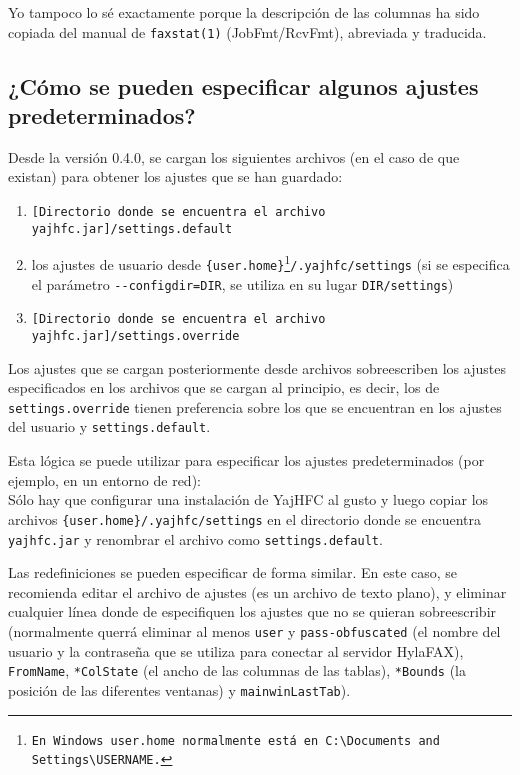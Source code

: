 \documentclass[a4paper,10pt]{scrartcl}
\begin{document}
Yo tampoco lo sé exactamente porque la descripción de las columnas ha sido copiada del manual de \verb#faxstat(1)# (JobFmt/RcvFmt), abreviada y traducida.

\subsection{¿Cómo se pueden especificar algunos ajustes predeterminados?}

Desde la versión 0.4.0, se cargan los siguientes archivos (en el caso de que existan) para obtener los ajustes que se han guardado:
\begin{enumerate}
 \item \texttt{[Directorio donde se encuentra el archivo yajhfc.jar]/settings.default}
 \item los ajustes de usuario desde \texttt{\{user.home\}\footnote{En Windows \texttt{user.home} normalmente está en \texttt{C:\textbackslash Documents and Settings\textbackslash USERNAME}.}/.yajhfc/settings} (si se especifica el parámetro \texttt{-{-}configdir=DIR}, se utiliza en su lugar \texttt{DIR/settings})
 \item \texttt{[Directorio donde se encuentra el archivo yajhfc.jar]/settings.override}
\end{enumerate}

Los ajustes que se cargan posteriormente desde archivos sobreescriben los ajustes especificados en los archivos que se cargan al principio, es decir, los de \texttt{settings.override} tienen preferencia sobre los que se encuentran en los ajustes del usuario y \texttt{settings.default}.
\medskip

Esta lógica se puede utilizar para especificar los ajustes predeterminados (por ejemplo, en un entorno de red): \\
Sólo hay que configurar una instalación de YajHFC al gusto y luego copiar los archivos \texttt{\{user.home\}/.yajhfc/settings} en el directorio donde se encuentra \texttt{yajhfc.jar} y renombrar el archivo como \texttt{settings.default}.
\medskip

Las redefiniciones se pueden especificar de forma similar. En este caso, se recomienda editar el archivo de ajustes (es un archivo de texto plano), y eliminar cualquier línea donde de especifiquen los ajustes que no se quieran sobreescribir (normalmente querrá eliminar al menos \texttt{user} y \texttt{pass-obfuscated} (el nombre del usuario y la contraseña que se utiliza para conectar al servidor HylaFAX), \texttt{FromName}, \texttt{*ColState} (el ancho de las columnas de las tablas), \texttt{*Bounds} (la posición de las diferentes ventanas) y \texttt{mainwinLastTab}).
\end{document}
